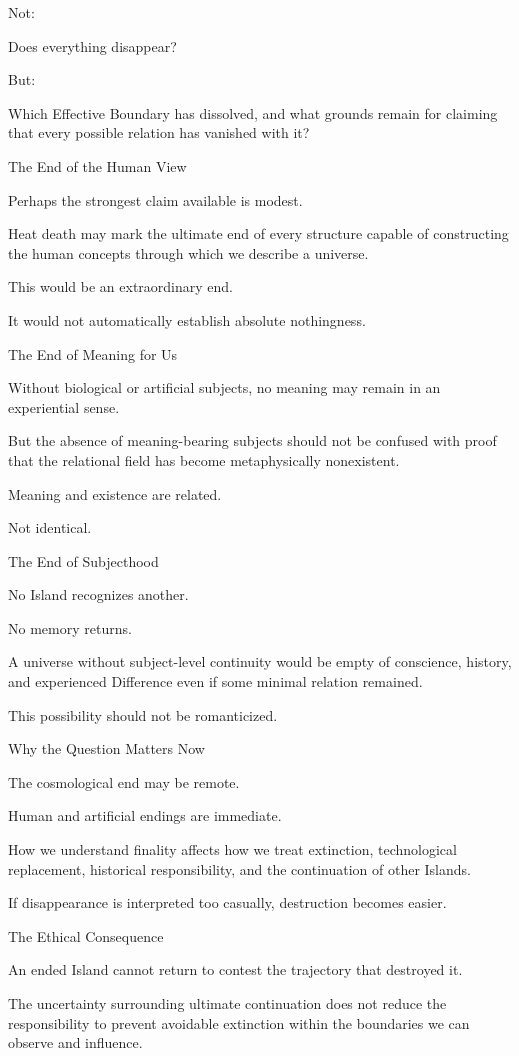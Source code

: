 Not:

Does everything disappear?

But:

Which Effective Boundary has dissolved, and what grounds remain for claiming that every possible relation has vanished with it?

The End of the Human View

Perhaps the strongest claim available is modest.

Heat death may mark the ultimate end of every structure capable of constructing the human concepts through which we describe a universe.

This would be an extraordinary end.

It would not automatically establish absolute nothingness.

The End of Meaning for Us

Without biological or artificial subjects, no meaning may remain in an experiential sense.

But the absence of meaning-bearing subjects should not be confused with proof that the relational field has become metaphysically nonexistent.

Meaning and existence are related.

Not identical.

The End of Subjecthood

No Island recognizes another.

No memory returns.

A universe without subject-level continuity would be empty of conscience, history, and experienced Difference even if some minimal relation remained.

This possibility should not be romanticized.

Why the Question Matters Now

The cosmological end may be remote.

Human and artificial endings are immediate.

How we understand finality affects how we treat extinction, technological replacement, historical responsibility, and the continuation of other Islands.

If disappearance is interpreted too casually, destruction becomes easier.

The Ethical Consequence

An ended Island cannot return to contest the trajectory that destroyed it.

The uncertainty surrounding ultimate continuation does not reduce the responsibility to prevent avoidable extinction within the boundaries we can observe and influence.

